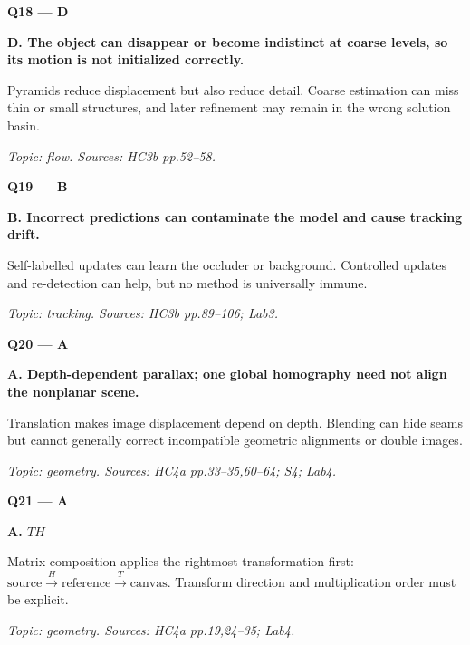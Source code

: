 \documentclass[11pt,a4paper]{article}
\begin{document}
\par\vspace{12pt}
\begin{minipage}{\linewidth}
\textbf{Q18 — D}\par\smallskip
\textbf{D. The object can disappear or become indistinct at coarse levels,\allowbreak{} so its motion is not initialized correctly.}\par
Pyramids reduce displacement but also reduce detail. Coarse estimation can miss thin or small structures,\allowbreak{} and later refinement may remain in the wrong solution basin.\par
{\small\itshape Topic: flow. Sources: HC3b pp.52–58.}

\end{minipage}
\par\vspace{12pt}
\begin{minipage}{\linewidth}
\textbf{Q19 — B}\par\smallskip
\textbf{B. Incorrect predictions can contaminate the model and cause tracking drift.}\par
Self-labelled updates can learn the occluder or background. Controlled updates and re-detection can help,\allowbreak{} but no method is universally immune.\par
{\small\itshape Topic: tracking. Sources: HC3b pp.89–106; Lab3.}

\end{minipage}
\par\vspace{12pt}
\begin{minipage}{\linewidth}
\textbf{Q20 — A}\par\smallskip
\textbf{A. Depth-dependent parallax; one global homography need not align the nonplanar scene.}\par
Translation makes image displacement depend on depth. Blending can hide seams but cannot generally correct incompatible geometric alignments or double images.\par
{\small\itshape Topic: geometry. Sources: HC4a pp.33–35,\allowbreak{}60–64; S4; Lab4.}

\end{minipage}
\par\vspace{12pt}
\begin{minipage}{\linewidth}
\textbf{Q21 — A}\par\smallskip
\textbf{A. \(TH\)}\par
Matrix composition applies the rightmost transformation first: \(\text{source}\xrightarrow{H}\text{reference}\xrightarrow{T}\text{canvas}\). Transform direction and multiplication order must be explicit.\par
{\small\itshape Topic: geometry. Sources: HC4a pp.19,\allowbreak{}24–35; Lab4.}

\end{minipage}
\end{document}
